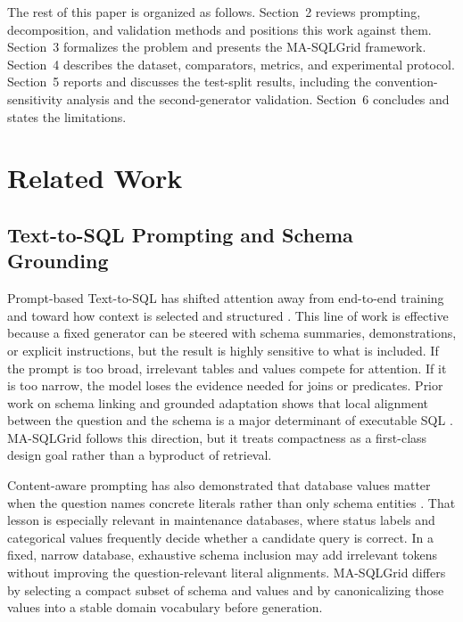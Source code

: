 \documentclass[cmc,article,submit,moreauthors,pdftex]{Definitions/tsp}
\begin{document}
The rest of this paper is organized as follows. Section~2 reviews prompting, decomposition, and validation methods and positions this work against them. Section~3 formalizes the problem and presents the MA-SQLGrid framework. Section~4 describes the dataset, comparators, metrics, and experimental protocol. Section~5 reports and discusses the test-split results, including the convention-sensitivity analysis and the second-generator validation. Section~6 concludes and states the limitations.

\section{Related Work}\label{related-work}

\subsection{Text-to-SQL Prompting and Schema Grounding}\label{sect:rw1}

Prompt-based Text-to-SQL has shifted attention away from end-to-end training and toward how context is selected and structured \cite{chang2023prompt,nan2023enhancing,sun2023sqlprompt}. This line of work is effective because a fixed generator can be steered with schema summaries, demonstrations, or explicit instructions, but the result is highly sensitive to what is included. If the prompt is too broad, irrelevant tables and values compete for attention. If it is too narrow, the model loses the evidence needed for joins or predicates. Prior work on schema linking and grounded adaptation shows that local alignment between the question and the schema is a major determinant of executable SQL \cite{lei2020reexamining,liu2021awakening,liu2022semantic,gan2021robustness}. MA-SQLGrid follows this direction, but it treats compactness as a first-class design goal rather than a byproduct of retrieval.

Content-aware prompting has also demonstrated that database values matter when the question names concrete literals rather than only schema entities \cite{herzig2020tapas,chen2023large,zhang2024structure}. That lesson is especially relevant in maintenance databases, where status labels and categorical values frequently decide whether a candidate query is correct. In a fixed, narrow database, exhaustive schema inclusion may add irrelevant tokens without improving the question-relevant literal alignments. MA-SQLGrid differs by selecting a compact subset of schema and values and by canonicalizing those values into a stable domain vocabulary before generation.
\end{document}
